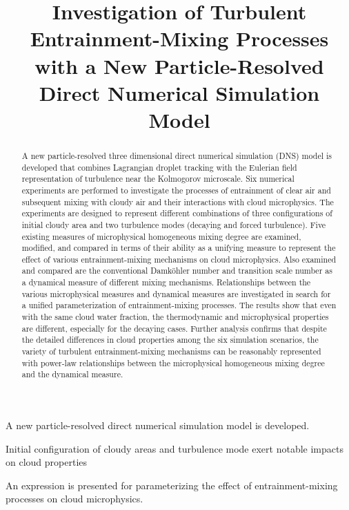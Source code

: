 \documentclass[draft,linenumbers]{agujournal}
\begin{document}
\title{Investigation of Turbulent Entrainment-Mixing Processes with a New Particle-Resolved Direct Numerical Simulation Model}



\begin{keypoints}
\item A new particle-resolved direct numerical simulation model is developed.
\item Initial configuration of cloudy areas and turbulence mode exert notable impacts on cloud properties
\item An expression is presented for parameterizing the effect of {\color{green}entrainment-mixing} processes on cloud microphysics.
\end{keypoints}

\begin{abstract}
A new particle-resolved three dimensional direct numerical simulation (DNS) model is developed that combines Lagrangian droplet tracking with the Eulerian field representation of turbulence near the Kolmogorov microscale. Six numerical experiments are performed to investigate the processes of entrainment of clear air and subsequent mixing with cloudy air and their interactions with cloud microphysics. The experiments are designed to represent different combinations of three configurations of initial cloudy area and two turbulence modes (decaying and forced turbulence). Five existing measures of microphysical homogeneous mixing degree are examined, modified, and compared in terms of their ability as a unifying measure to represent the effect of various entrainment-mixing mechanisms on cloud microphysics. Also examined and compared are the conventional Damk\"ohler number and transition scale number as a dynamical measure of different mixing mechanisms. Relationships between the various microphysical measures and dynamical measures are investigated in search for a unified parameterization of entrainment-mixing processes. The results show that even with the same cloud water fraction, the thermodynamic and microphysical properties are different, especially for the decaying cases. Further analysis confirms that despite the detailed differences in cloud properties among the six simulation scenarios, the variety of turbulent entrainment-mixing mechanisms can be reasonably represented with power-law relationships between the microphysical homogeneous mixing degree and the dynamical measure.    
\end{abstract}
\end{document}
